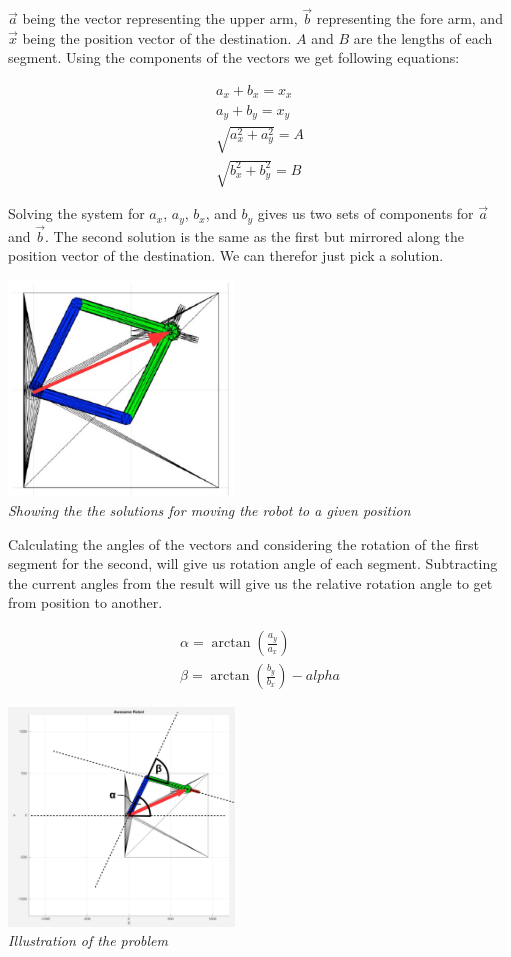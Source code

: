 $\vec{a}$ being the vector representing the upper arm, $\vec{b}$ representing the fore arm, and $\vec{x}$ being the position vector of the destination. $A$ and $B$ are the lengths of each segment. Using the components of the vectors we get following equations:

\begin{align*}
a_x + b_x = x_x\\
a_y + b_y = x_y\\
\sqrt{a_x^2 + a_y^2} = A\\
\sqrt{b_x^2 + b_y^2} = B
\end{align*}

Solving the system for $a_x$, $a_y$, $b_x$, and $b_y$ gives us two sets of components for $\vec{a}$ and $\vec{b}$. The second solution is the same as the first but mirrored along the position vector of the destination. We can therefor just pick a solution.

\begin{center}
\includegraphics[width=0.45\textwidth]{imgs/AngleCalc/robot_altSolution.jpg}\\
\textit{Showing the the solutions for moving the robot to a given position}
\end{center}

\pagebreak

Calculating the angles of the vectors and considering the rotation of the first segment for the second, will give us rotation angle of each segment. Subtracting the current angles from the result will give us the relative rotation angle to get from position to another.

\begin{align*}
\alpha = \arctan(\frac{a_y}{a_x})\\
\beta = \arctan(\frac{b_y}{b_x}) - alpha
\end{align*}

\begin{center}
\includegraphics[width=0.45\textwidth]{imgs/AngleCalc/robot_rotAngleCalc.jpg}\\
\textit{Illustration of the problem}
\end{center}


